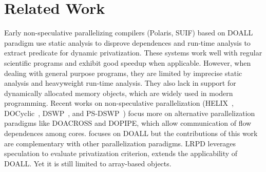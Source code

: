 \section{Related Work}






Early non-speculative parallelizing compilers (Polaris, SUIF) based on
DOALL paradigm use static analysis to disprove dependences and run-time
analysis to extract predicate for dynamic privatization. These systems work
well with regular scientific programs and exhibit good speedup when
applicable. However, when dealing with general purpose programs, they are
limited by imprecise static analysis and heavyweight run-time analysis.
They also lack in support for dynamically allocated memory objects, which
are widely used in modern programming. Recent works on non-speculative
parallelization (HELIX~\cite{simone:12:cgo}, DOCyclic~\cite{yu2016cyclical}, DSWP~\cite{ottoni:05:micro}, and PS-DSWP~\cite{raman:08a:cgo}) focus more on alternative
parallelization paradigms like DOACROSS and DOPIPE, which allow
communication of flow dependences among cores. \name focuses on DOALL but
the contributions of this work are complementary with other parallelization
paradigms. LRPD leverages speculation to evaluate privatization criterion,
extends the applicability of DOALL. Yet it is still limited to array-based
objects.

